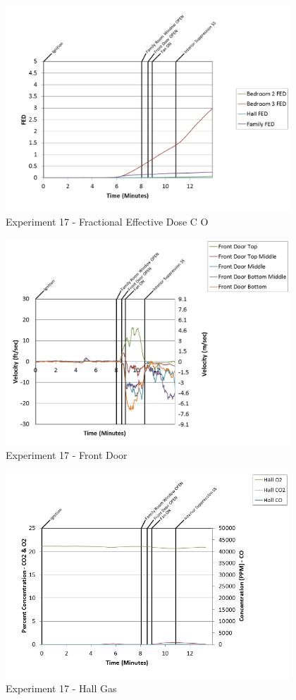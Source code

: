 \documentclass{article}
\begin{document}
\begin{appendices}
\begin{figure}[h!]
	\centering
	\includegraphics[height=3.05in]{0_Images/Results_Charts/Exp_17_Charts/FractionalEffectiveDoseCO.png}
	\caption{Experiment 17 - Fractional Effective Dose C O}
\end{figure}

\clearpage

\begin{figure}[h!]
	\centering
	\includegraphics[height=3.05in]{0_Images/Results_Charts/Exp_17_Charts/FrontDoor.png}
	\caption{Experiment 17 - Front Door}
\end{figure}


\begin{figure}[h!]
	\centering
	\includegraphics[height=3.05in]{0_Images/Results_Charts/Exp_17_Charts/HallGas.png}
	\caption{Experiment 17 - Hall Gas}
\end{figure}


\end{appendices}
\end{document}
